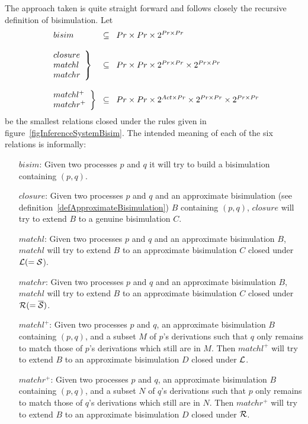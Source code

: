 The approach taken is quite straight forward and follows closely the recursive definition of bisimulation. Let
\[
\begin{array}{l@{\;\;\;}c@{\;\;\;}l}
\left.\begin{array}{l}bisim\end{array}\right.    & \subseteq & Pr\times Pr\times 2^{Pr\times Pr}\\
\\
\left.\begin{array}{l}closure\\ matchl\\ matchr\end{array}\right\}
         & \subseteq & Pr\times Pr\times 2^{Pr\times Pr}\times 2^{Pr\times Pr}\\
\\
\left.\begin{array}{l}matchl^{+}\\ matchr^{+}\end{array}\right\}
         & \subseteq & Pr\times Pr\times 2^{Act\times Pr}\times 2^{Pr\times Pr}\times 2^{Pr\times Pr}\\
\end{array}
\]
be the smallest relations closed under the rules given in figure~\ref{figInferenceSystemBisim}. The intended meaning of each of the six relations is informally:
\begin{itemize}
\item[$bisim$:] Given two processes $p$ and $q$ it will try to build a bisimulation containing $(p,q)$.

\item[$closure$:] Given two processes $p$ and $q$ and an approximate bisimulation (see definition~\ref{defApproximateBisimulation}) $B$ containing $(p,q)$, $closure$ will try to extend $B$ to a genuine bisimulation $C$.

\item[$matchl$:] Given two processes $p$ and $q$ and an approximate bisimulation $B$, $matchl$ will try to extend $B$ to an approximate bisimulation $C$ closed under ${\cal L}(={\cal S}$).

\item[$matchr$:] Given two processes $p$ and $q$ and an approximate bisimulation $B$, $matchl$ will try to extend $B$ to an approximate bisimulation $C$ closed under ${\cal R}(=\overline{\cal S})$.

\item[$matchl^{+}$:] Given two processes $p$ and $q$, an approximate bisimulation $B$ containing $(p,q)$, and a subset $M$ of $p$'s derivations such that $q$ only remains to match those of $p$'s derivations which still are in $M$. Then $matchl^{+}$ will try to extend $B$ to an approximate bisimulation $D$ closed under ${\cal L}$.

\item[$matchr^{+}$:] Given two processes $p$ and $q$, an approximate bisimulation $B$ containing $(p,q)$, and a subset $N$ of $q$'s derivations such that $p$ only remains to match those of $q$'s derivations which still are in $N$. Then $matchr^{+}$ will try to extend $B$ to an approximate bisimulation $D$ closed under ${\cal R}$.

\end{itemize}

